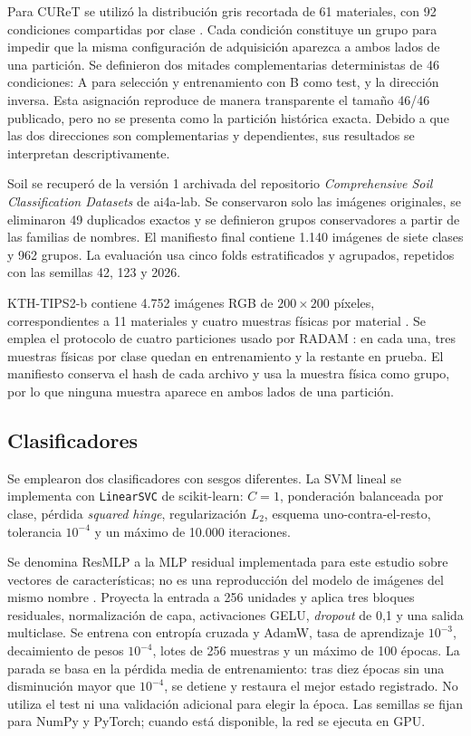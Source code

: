 \documentclass[a4paper,fleqn]{cas-sc}
\begin{document}
Para CUReT se utilizó la distribución gris recortada de 61 materiales, con 92 condiciones compartidas por clase \citep{varma2003filter}. Cada condición constituye un grupo para impedir que la misma configuración de adquisición aparezca a ambos lados de una partición. Se definieron dos mitades complementarias deterministas de 46 condiciones: A para selección y entrenamiento con B como test, y la dirección inversa. Esta asignación reproduce de manera transparente el tamaño 46/46 publicado, pero no se presenta como la partición histórica exacta. Debido a que las dos direcciones son complementarias y dependientes, sus resultados se interpretan descriptivamente.

Soil se recuperó de la versión 1 archivada del repositorio \emph{Comprehensive Soil Classification Datasets} de ai4a-lab. Se conservaron solo las imágenes originales, se eliminaron 49 duplicados exactos y se definieron grupos conservadores a partir de las familias de nombres. El manifiesto final contiene 1.140 imágenes de siete clases y 962 grupos. La evaluación usa cinco folds estratificados y agrupados, repetidos con las semillas 42, 123 y 2026.

KTH-TIPS2-b contiene 4.752 imágenes RGB de $200\times200$ píxeles, correspondientes a 11 materiales y cuatro muestras físicas por material \citep{mallikarjuna2005kth}. Se emplea el protocolo de cuatro particiones usado por RADAM \citep{scabini2023radam}: en cada una, tres muestras físicas por clase quedan en entrenamiento y la restante en prueba. El manifiesto conserva el hash de cada archivo y usa la muestra física como grupo, por lo que ninguna muestra aparece en ambos lados de una partición.

\subsection{Clasificadores}

Se emplearon dos clasificadores con sesgos diferentes. La SVM lineal se implementa con \texttt{LinearSVC} de scikit-learn: $C=1$, ponderación balanceada por clase, pérdida \emph{squared hinge}, regularización $L_2$, esquema uno-contra-el-resto, tolerancia $10^{-4}$ y un máximo de 10.000 iteraciones.

Se denomina ResMLP a la MLP residual implementada para este estudio sobre vectores de características; no es una reproducción del modelo de imágenes del mismo nombre \citep{touvron2021resmlp}. Proyecta la entrada a 256 unidades y aplica tres bloques residuales, normalización de capa, activaciones GELU, \emph{dropout} de 0,1 y una salida multiclase. Se entrena con entropía cruzada y AdamW, tasa de aprendizaje $10^{-3}$, decaimiento de pesos $10^{-4}$, lotes de 256 muestras y un máximo de 100 épocas. La parada se basa en la pérdida media de entrenamiento: tras diez épocas sin una disminución mayor que $10^{-4}$, se detiene y restaura el mejor estado registrado. No utiliza el test ni una validación adicional para elegir la época. Las semillas se fijan para NumPy y PyTorch; cuando está disponible, la red se ejecuta en GPU.
\end{document}
